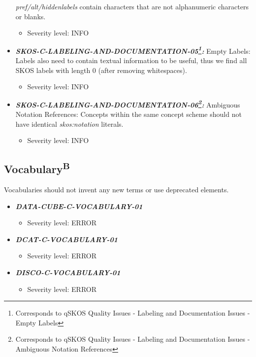 \documentclass{llncs}
\begin{document}
\begin{itemize}
	\emph{pref/alt/hiddenlabels} contain characters that are not alphanumeric characters or blanks.
	\begin{itemize}
		\item Severity level: INFO
	\end{itemize}
	\item \textbf{{\em SKOS-C-LABELING-AND-DOCUMENTATION-05\footnote{Corresponds to qSKOS Quality Issues - Labeling and Documentation Issues - Empty Labels}:}}
	Empty Labels:
	Labels also need to contain textual information to be useful, thus we find all SKOS labels with length 0 (after removing whitespaces). 
	\begin{itemize}
		\item Severity level: INFO
	\end{itemize}
	\item \textbf{{\em SKOS-C-LABELING-AND-DOCUMENTATION-06\footnote{Corresponds to qSKOS Quality Issues - Labeling and Documentation Issues - Ambiguous Notation References}:}}
	Ambiguous Notation References:
	Concepts within the same concept scheme should not have identical \emph{skos:notation} literals. 
	\begin{itemize}
		\item Severity level: INFO
	\end{itemize}
\end{itemize}

\subsection{Vocabulary\textsuperscript{B}}
Vocabularies should not invent any new terms or use deprecated elements. 

\begin{itemize}
	\item \textbf{\em DATA-CUBE-C-VOCABULARY-01} 
	\begin{itemize}
		\item Severity level: ERROR
	\end{itemize}
\end{itemize}

\begin{itemize}
	\item \textbf{\em DCAT-C-VOCABULARY-01} 
	\begin{itemize}
		\item Severity level: ERROR
	\end{itemize}
\end{itemize}

\begin{itemize}
	\item \textbf{\em DISCO-C-VOCABULARY-01} 
	\begin{itemize}
		\item Severity level: ERROR
	\end{itemize}
\end{itemize}
\end{document}
